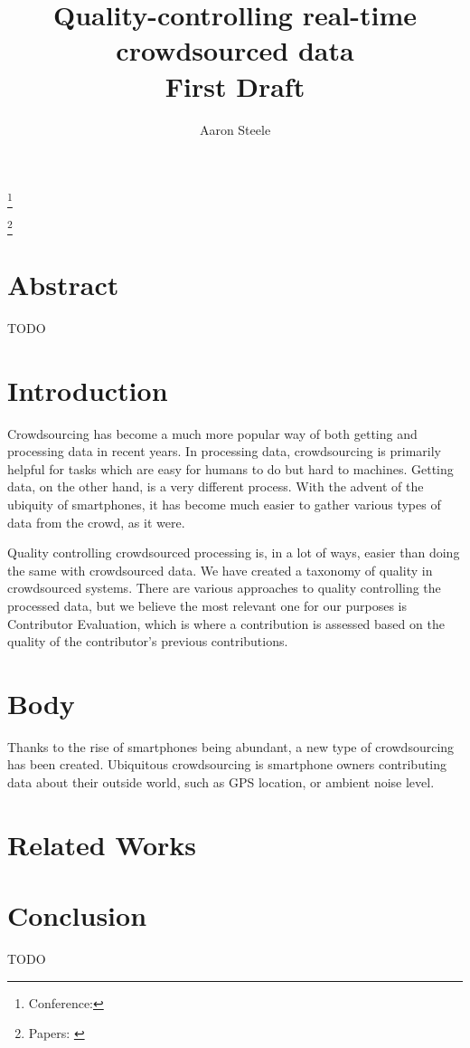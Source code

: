\documentclass[12pt,twocolumn]{article}
\title{Quality-controlling real-time crowdsourced data \\ \large First Draft}
\author{Aaron Steele}
\date{}
\newcommand\blfootnote[1]{%
	\begingroup
	\renewcommand\thefootnote{}\footnote{#1}%
	\addtocounter{footnote}{-1}%
	\endgroup
}
\begin{document}
	\maketitle
	
	\blfootnote{Conference: }
	\blfootnote{Papers: \cite{UB-QC-CC}\cite{QC-CC}}
	
	
	\section*{Abstract}
	    TODO
	\section*{Introduction}
	    Crowdsourcing has become a much more popular way of both getting and processing data in recent years. In processing data, crowdsourcing is primarily helpful for tasks which are easy for humans to do but hard to machines. %
	    Getting data, on the other hand, is a very different process. With the advent of the ubiquity of smartphones, it has become much easier to gather various types of data from the crowd, as it were.
	    
	    Quality controlling crowdsourced processing is, in a lot of ways, easier than doing the same with crowdsourced data. We have created a taxonomy of quality in crowdsourced systems. There are various approaches to quality controlling the processed data, but we believe the most relevant one for our purposes is Contributor Evaluation, which is where a contribution is assessed based on the quality of the contributor's previous contributions. 
	    
	\section*{Body}
	    Thanks to the rise of smartphones being abundant, a new type of crowdsourcing has been created. Ubiquitous crowdsourcing is smartphone owners contributing data about their outside world, such as GPS location, or ambient noise level. 
	    
	\section*{Related Works}
	    
	    
	\section*{Conclusion}
	    TODO
	
	
\end{document}
